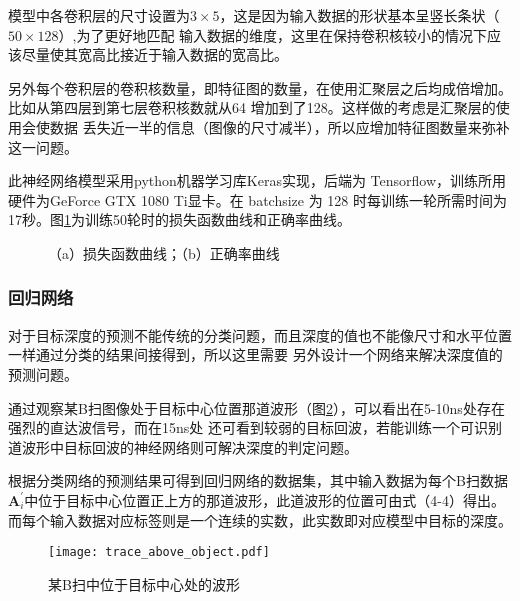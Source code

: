 模型中各卷积层的尺寸设置为$3\times 5$，这是因为输入数据的形状基本呈竖长条状（$50\times 128$）,为了更好地匹配
输入数据的维度，这里在保持卷积核较小的情况下应该尽量使其宽高比接近于输入数据的宽高比。

另外每个卷积层的卷积核数量，即特征图的数量，在使用汇聚层之后均成倍增加。比如从第四层到第七层卷积核数就从64
增加到了128。这样做的考虑是汇聚层的使用会使数据
丢失近一半的信息（图像的尺寸减半），所以应增加特征图数量来弥补这一问题。

此神经网络模型采用python机器学习库Keras实现，后端为 Tensorflow，训练所用硬件为GeForce GTX 1080 Ti显卡。在
batchsize 为 128 时每训练一轮所需时间为17秒。图\ref{loss_acc_curve}为训练50轮时的损失函数曲线和正确率曲线。
\begin{figure}[htbp]
	\caption{（a）损失函数曲线；（b）正确率曲线}
	\label{loss_acc_curve}
\end{figure}
\subsubsection{回归网络}
对于目标深度的预测不能传统的分类问题，而且深度的值也不能像尺寸和水平位置一样通过分类的结果间接得到，所以这里需要
另外设计一个网络来解决深度值的预测问题。

通过观察某B扫图像处于目标中心位置那道波形（图\ref{trace_above_object}），可以看出在5-10ns处存在强烈的直达波信号，而在15ns处
还可看到较弱的目标回波，若能训练一个可识别道波形中目标回波的神经网络则可解决深度的判定问题。

根据分类网络的预测结果可得到回归网络的数据集，其中输入数据为每个B扫数据$\mathbf{A}^{\prime}_i$中位于目标中心位置正上方的那道波形，此道波形的位置可由式（4-4）得出。而每个输入数据对应标签则是一个连续的实数，此实数即对应模型中目标的深度。
\begin{figure}[htbp]
	\texttt{[image: trace\_above\_object.pdf]}
	\caption{某B扫中位于目标中心处的波形}
	\label{trace_above_object}
\end{figure}

